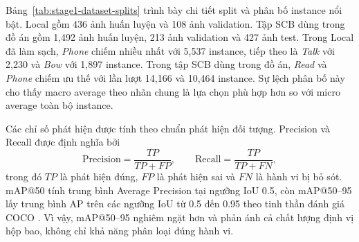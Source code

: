 \begin{table}[htbp]
\centering
\caption{Thống kê tập dữ liệu dùng trong Stage 1 sau khi ánh xạ và làm sạch nhãn.}
\label{tab:stage1-dataset-stats}
\end{table}

Bảng~\ref{tab:stage1-dataset-splits} trình bày chi tiết split và phân bố instance nổi bật. Local gồm 436 ảnh huấn luyện và 108 ảnh validation. Tập SCB dùng trong đồ án gồm 1,492 ảnh huấn luyện, 213 ảnh validation và 427 ảnh test. Trong Local đã làm sạch, \textit{Phone} chiếm nhiều nhất với 5,537 instance, tiếp theo là \textit{Talk} với 2,230 và \textit{Bow} với 1,897 instance. Trong tập SCB dùng trong đồ án, \textit{Read} và \textit{Phone} chiếm ưu thế với lần lượt 14,166 và 10,464 instance. Sự lệch phân bố này cho thấy macro average theo nhãn chung là lựa chọn phù hợp hơn so với micro average toàn bộ instance.

\begin{table}[htbp]
\centering
\caption{Split và đặc điểm phân bố của hai bộ dữ liệu phát hiện hành vi.}
\label{tab:stage1-dataset-splits}
\end{table}

Các chỉ số phát hiện được tính theo chuẩn phát hiện đối tượng. Precision và Recall được định nghĩa bởi
\begin{equation}
\label{eq:detector-precision-recall}
    \mathrm{Precision}=\frac{TP}{TP+FP}, \qquad
    \mathrm{Recall}=\frac{TP}{TP+FN},
\end{equation}
trong đó \(TP\) là phát hiện đúng, \(FP\) là phát hiện sai và \(FN\) là hành vi bị bỏ sót. mAP@50 tính trung bình Average Precision tại ngưỡng IoU 0.5, còn mAP@50--95 lấy trung bình AP trên các ngưỡng IoU từ 0.5 đến 0.95 theo tinh thần đánh giá COCO \cite{lin2014coco}. Vì vậy, mAP@50--95 nghiêm ngặt hơn và phản ánh cả chất lượng định vị hộp bao, không chỉ khả năng phân loại đúng hành vi.